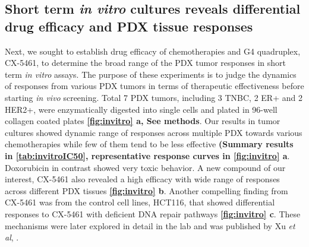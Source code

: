 

\subsection{Short term \textit {in vitro} cultures reveals differential drug efficacy and PDX tissue responses
}
Next, we sought to establish drug efficacy of chemotherapies and G4 quadruplex, CX-5461, to determine the broad range of the PDX tumor responses in short term \textit{in vitro} assays. The purpose of these experiments is to judge the dynamics of responses from various PDX tumors in terms of therapeutic effectiveness before starting \textit{in vivo} screening. Total 7 PDX tumors, including 3 TNBC, 2 ER+ and 2 HER2+, were enzymatically digested into single cells and plated in 96-well collagen coated plates  \textbf{\autoref{fig:invitro} a, See methods}. 
Our results in tumor cultures showed dynamic range of responses across multiple PDX towards various chemotherapies while few of them tend to be less effective \textbf{(Summary results in \autoref{tab:invitroIC50}, representative response curves in \autoref{fig:invitro} a}. Doxorubicin in contrast showed very toxic behavior. A new compound of our interest, CX-5461 also revealed a high efficacy with wide range of responses across different PDX tissues \textbf{\autoref{fig:invitro} b}. Another compelling finding from CX-5461 was from the control cell lines, HCT116, that showed differential responses to CX-5461 with deficient DNA repair pathways \textbf{\autoref{fig:invitro} c}. These mechanisms were later explored in detail in the lab and was published by Xu \textit{et al}, \cite{xu2017cx}. 

